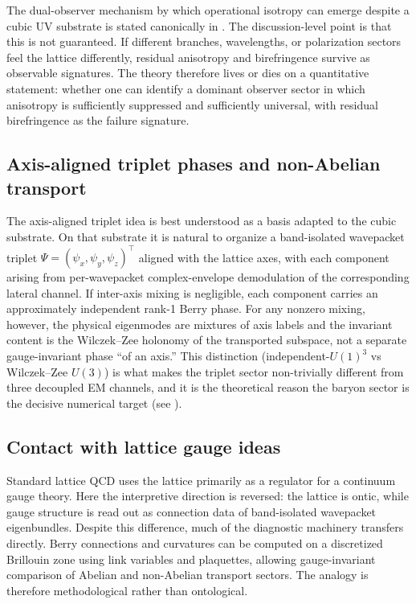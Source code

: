 The dual-observer mechanism by which operational isotropy can emerge despite a cubic UV substrate is stated
canonically in .
The discussion-level point is that this is not guaranteed.
If different branches, wavelengths, or polarization sectors feel the lattice differently, residual anisotropy and
birefringence survive as observable signatures.
The theory therefore lives or dies on a quantitative statement: whether one can identify a dominant observer sector in
which anisotropy is sufficiently suppressed and sufficiently universal, with residual birefringence as the failure
signature.

\subsection{Axis-aligned triplet phases and non-Abelian transport}
\label{subsec:discussion-axis-triplet}

The axis-aligned triplet idea is best understood as a basis adapted to the cubic substrate.
On that substrate it is natural to organize a band-isolated wavepacket triplet
$\Psi=(\psi_x,\psi_y,\psi_z)^\top$ aligned with the lattice axes, with each component arising from per-wavepacket
complex-envelope demodulation of the corresponding lateral channel.
If inter-axis mixing is negligible, each component carries an approximately independent rank-1 Berry phase.
For any nonzero mixing, however, the physical eigenmodes are mixtures of axis labels and the invariant content is the
Wilczek--Zee holonomy of the transported subspace, not a separate gauge-invariant phase ``of an axis.''
This distinction (independent-$U(1)^3$ vs Wilczek--Zee $U(3)$) is what makes the triplet sector non-trivially
different from three decoupled EM channels, and it is the theoretical reason the baryon sector is the decisive
numerical target (see ).

\subsection{Contact with lattice gauge ideas}
\label{subsec:discussion-lqcd}

Standard lattice QCD uses the lattice primarily as a regulator for a continuum gauge theory.
Here the interpretive direction is reversed: the lattice is ontic, while gauge structure is read out as connection data
of band-isolated wavepacket eigenbundles.
Despite this difference, much of the diagnostic machinery transfers directly.
Berry connections and curvatures can be computed on a discretized Brillouin zone using link variables and plaquettes,
allowing gauge-invariant comparison of Abelian and non-Abelian transport sectors.
The analogy is therefore methodological rather than ontological.

